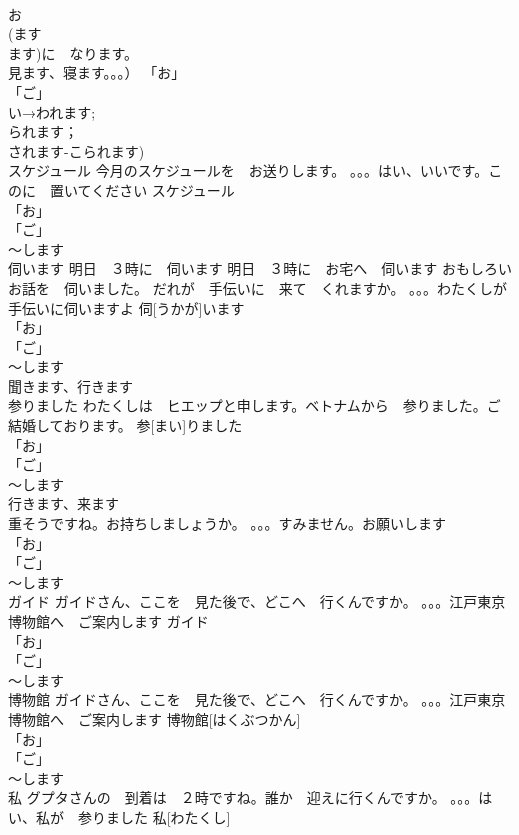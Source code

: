 \documentclass[8pt]{extreport}
\begin{document}
\begin{CJK}{UTF8}{min}
\\	お
\\	(ます
\\	ます)に　なります。
\\	見ます、寝ます。。。） 「お」
\\	「ご」
\\	い→われます;
\\	られます；
\\	されます-こられます)
\\	スケジュール	今月のスケジュールを　お送りします。 。。。はい、いいです。このに　置いてください	スケジュール			
\\	「お」
\\	「ご」
\\	～します		
\\	伺います	明日　３時に　伺います 明日　３時に　お宅へ　伺います おもしろい　お話を　伺いました。 だれが　手伝いに　来て　くれますか。 。。。わたくしが　手伝いに伺いますよ	伺[うかが]います			
\\	「お」
\\	「ご」
\\	～します 
\\	聞きます、行きます
\\	参りました	わたくしは　ヒエップと申します。ベトナムから　参りました。ご結婚しております。	参[まい]りました			
\\	「お」
\\	「ご」
\\	～します 
\\	行きます、来ます
\\	重そうですね。お持ちしましょうか。 。。。すみません。お願いします	
\\	「お」
\\	「ご」
\\	～します 
\\	ガイド	ガイドさん、ここを　見た後で、どこへ　行くんですか。 。。。江戸東京博物館へ　ご案内します	ガイド			
\\	「お」
\\	「ご」
\\	～します 
\\	博物館	ガイドさん、ここを　見た後で、どこへ　行くんですか。 。。。江戸東京博物館へ　ご案内します	博物館[はくぶつかん]			
\\	「お」
\\	「ご」
\\	～します 
\\	私	グプタさんの　到着は　２時ですね。誰か　迎えに行くんですか。 。。。はい、私が　参りました	私[わたくし]			

\end{CJK}
\end{document}
